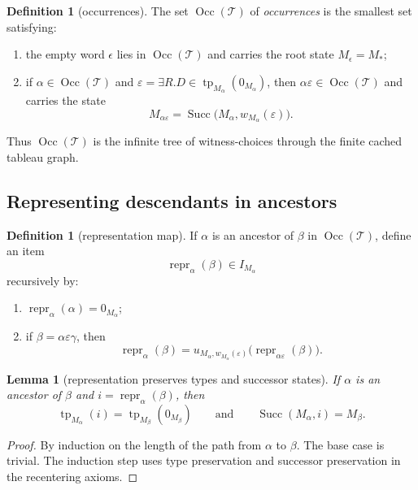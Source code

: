 \documentclass[11pt]{article}
\newtheorem{lemma}[theorem]{Lemma}
\theoremstyle{definition}
\newtheorem{definition}[theorem]{Definition}
\newcommand{\tp}{\operatorname{tp}}
\newcommand{\Succ}{\operatorname{Succ}}
\newcommand{\repr}{\operatorname{repr}}
\newcommand{\occ}{\operatorname{Occ}}
\begin{document}
\begin{definition}[occurrences]
The set $\occ(\mathcal T)$ of \emph{occurrences} is the smallest set satisfying:
\begin{enumerate}[label=(O\arabic*)]
    \item the empty word $\epsilon$ lies in $\occ(\mathcal T)$ and carries the root state $M_\epsilon=M_\ast$;
    \item if $\alpha\in \occ(\mathcal T)$ and $\varepsilon=\exists R.D\in \tp_{M_\alpha}(0_{M_\alpha})$, then $\alpha\varepsilon\in \occ(\mathcal T)$ and carries the state
    \[
    M_{\alpha\varepsilon}=\Succ\bigl(M_\alpha,w_{M_\alpha}(\varepsilon)\bigr).
    \]
\end{enumerate}
\end{definition}

Thus $\occ(\mathcal T)$ is the infinite tree of witness-choices through the finite cached tableau graph.

\subsection{Representing descendants in ancestors}

\begin{definition}[representation map]
If $\alpha$ is an ancestor of $\beta$ in $\occ(\mathcal T)$, define an item
\[
\repr_\alpha(\beta)\in I_{M_\alpha}
\]
recursively by:
\begin{enumerate}[label=(P\arabic*)]
    \item $\repr_\alpha(\alpha)=0_{M_\alpha}$;
    \item if $\beta=\alpha\varepsilon\gamma$, then
    \[
    \repr_\alpha(\beta)=u_{M_\alpha,w_{M_\alpha}(\varepsilon)}\bigl(\repr_{\alpha\varepsilon}(\beta)\bigr).
    \]
\end{enumerate}
\end{definition}

\begin{lemma}[representation preserves types and successor states]\label{lem:repr-pres}
If $\alpha$ is an ancestor of $\beta$ and $i=\repr_\alpha(\beta)$, then
\[
\tp_{M_\alpha}(i)=\tp_{M_\beta}(0_{M_\beta})
\qquad\text{and}\qquad
\Succ(M_\alpha,i)=M_\beta.
\]
\end{lemma}

\begin{proof}
By induction on the length of the path from $\alpha$ to $\beta$. The base case is trivial. The induction step uses type preservation and successor preservation in the recentering axioms.
\end{proof}
\end{document}
